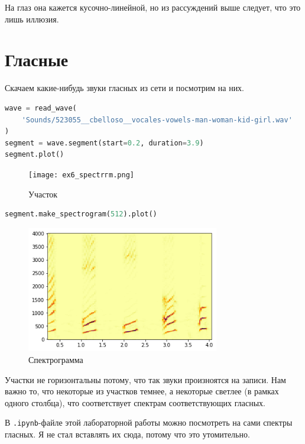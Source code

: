 \documentclass[a4paper,12pt]{report}
\begin{document}
    На глаз она кажется кусочно-линейной, но из рассуждений выше следует, что это лишь иллюзия.
    
    \chapter{Гласные}
    
    Скачаем какие-нибудь звуки гласных из сети и посмотрим на них.
    
\begin{lstlisting}[language=Python,caption=Выбираем участок]
wave = read_wave(
    'Sounds/523055__cbelloso__vocales-vowels-man-woman-kid-girl.wav'
)
segment = wave.segment(start=0.2, duration=3.9)
segment.plot()
\end{lstlisting}

    \begin{figure}[H]
        \centering
        \texttt{[image: ex6\_spectrгm.png]}
        \caption{Участок}
        \label{fig:ex6_spectrгm}
    \end{figure}
    
\begin{lstlisting}[language=Python,caption=Спектрограмма]
segment.make_spectrogram(512).plot()
\end{lstlisting}

    \begin{figure}[H]
        \centering
        \includegraphics[width=0.75\textwidth]{ex6_spectrogram.png}
        \caption{Спектрограмма}
        \label{fig:ex6_spectrogram}
    \end{figure}
    
    Участки не горизонтальны потому, что так звуки произноятся на записи. Нам важно то, что некоторые из участков темнее, а некоторые светлее (в рамках одного столбца), что соответствует спектрам соответствующих гласных.
    
    В \texttt{.ipynb}-файле этой лабораторной работы можно посмотреть на сами спектры гласных. Я не стал вставлять их сюда, потому что это утомительно.
    
\end{document}
